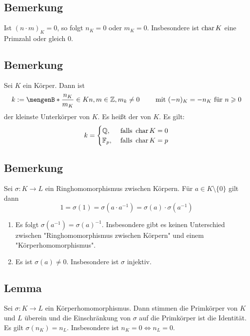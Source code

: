 \subsection[Bemerkung: Die Charakteristik ist immer 0 oder eine Primzahl]{Bemerkung} %
\label{sub:134}
Ist $(n \cdot m)_K=0$, so folgt $n_K=0$ oder $m_K=0$. Insbesondere ist $\operatorname{char} K$ eine Primzahl oder gleich $0$.

\subsection[Bemerkung: kleinster Unterkörper/Primkörper]{Bemerkung} %
\label{sub:135}
Sei $K$ ein Körper. Dann ist 
\[
	k := \set[\frac{n_K}{m_K} \in K]{n,m \in \mathds{Z}, m_k \not= 0} \qquad \text{ mit } (-n)_K = - n_K \text{ für } n \ge 0
\]
der kleinste Unterkörper von $K$. Es heißt der  von $K$. Es gilt: 
\[
	k = \begin{cases}
		\mathbb{Q}, &\text{ falls }\operatorname{char} K =0\\
		\mathbb{F}_p ,&\text{ falls } \operatorname{char} K =p
	\end{cases}
\]

\subsection[Bemerkung über Ringhomomorphismen zwischen Körpern]{Bemerkung} %
\label{sub:136}
Sei $\sigma : K \to L$ ein Ringhomomorphismus zwischen Körpern. Für $a \in K \setminus \{0\}$ gilt dann 
\[
	1 = \sigma(1) = \sigma(a \cdot a ^{-1}) = \sigma(a) \cdot \sigma(a ^{-1})
\]
\begin{enumerate}[1)]
	\item Es folgt $\sigma(a ^{-1})= \sigma(a) ^{-1}$. Insbesondere gibt es keinen Unterschied zwischen  "{}Ringhomomorphismus zwischen Körpern"{} und einem 
	"{}Körperhomomorphismus"{}.
	\item Es ist $\sigma(a) \not=0$. Insbesondere ist $\sigma$ injektiv.
\end{enumerate}

\subsection[Lemma: Die Primkörper von homomorphen Körpern stimmen überein]{Lemma} %
\label{sub:137}
Sei $\sigma : K \to L$ ein Körperhomomorphismus. Dann stimmen die Primkörper von $K$ und $L$ überein und die Einschränkung von $\sigma$ auf die Primkörper ist die 
Identität.
Es gilt $\sigma(n_K)= n_L$. Insbesondere ist $n_K=0 \iff n_L=0$. \bewende

